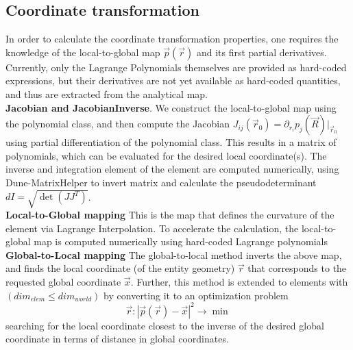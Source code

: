 \subsection{Coordinate transformation}

In order to calculate the coordinate transformation properties, one requires the knowledge of the local-to-global map $\vec{p}(\vec{r})$ and its first partial derivatives. Currently, only the Lagrange Polynomials themselves are provided as hard-coded expressions, but their derivatives are not yet available as hard-coded quantities, and thus are extracted from the analytical map. \\

\noindent
\textbf{Jacobian and JacobianInverse}.
We construct the local-to-global map using the polynomial class, and then compute the Jacobian $J_{ij}(\vec{r}_0) = \partial_{r_i} p_j (\vec{R}) |_{\vec{r}_0}$ using partial differentiation of the polynomial class. This results in a matrix of polynomials, which can be evaluated for the desired local coordinate(s). The inverse and integration element of the element are computed numerically, using Dune-MatrixHelper to invert matrix and calculate the pseudodeterminant $dI = \sqrt{\det(JJ^T)}$. \\

\noindent
\textbf{Local-to-Global mapping}
This is the map that defines the curvature of the element via Lagrange Interpolation. To accelerate the calculation, the local-to-global map is computed numerically using hard-coded Lagrange polynomials \\

\noindent
\textbf{Global-to-Local mapping}
The global-to-local method inverts the above map, and finds the local coordinate (of the entity geometry) $\vec{r}$ that corresponds to the requested global coordinate $\vec{x}$. Further, this method is extended to elements with $(dim_{elem} \leq dim_{world})$ by converting it to an optimization problem
\begin{equation}
  \label{eq-theory-mapping-optimization}
  \vec{r} : |\vec{p}(\vec{r}) - \vec{x} |^2 \rightarrow \min
\end{equation} 
searching for the local coordinate closest to the inverse of the desired global coordinate in terms of distance in global coordinates. \\

